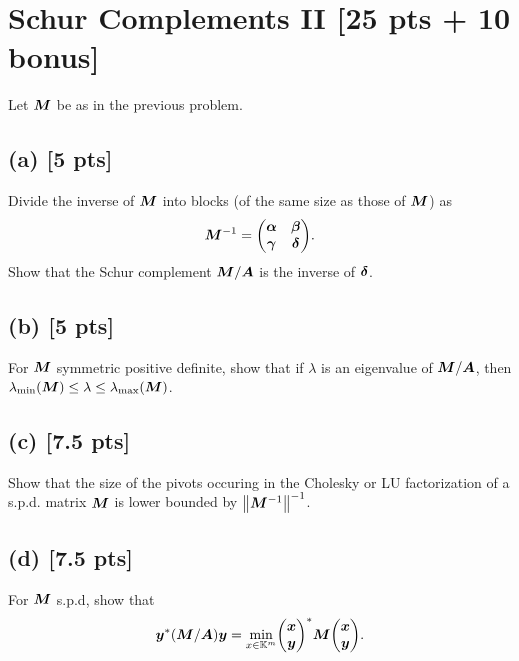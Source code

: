 \documentclass[twoside,10pt]{article}
\begin{document}
\section{Schur Complements II [25 pts + 10 bonus]}
Let $\bm{M}$ be as in the previous problem. 

\subsection*{(a) [5 pts]}
Divide the inverse of $\bm{M}$ into blocks (of the same size as those of $\bm{M}$) as
\begin{equation}
  \mtx{M}^{-1} = 
  \begin{pmatrix}
    \mtx{\alpha} & \mtx{\beta} \\
    \mtx{\gamma} & \mtx{\delta}
  \end{pmatrix}.
\end{equation}
Show that the Schur complement $\bm{M} / \bm{A}$ is the inverse of $\bm{\delta}$.

\subsection*{(b) [5 pts]} 
For $\bm{M}$ symmetric positive definite, show that if $\lambda$ is an eigenvalue of $\bm{M} / \bm{A}$, then $\lambda_{\min}\left(\mtx{M} \right) \leq \lambda \leq \lambda_{\max}\left(\mtx{M}\right)$.

\subsection*{(c) [7.5 pts]} 
Show that the size of the pivots occuring in the Cholesky or LU factorization of a s.p.d. matrix $\bm{M}$ is lower bounded by $\left\|\mtx{M}^{-1}\right\|^{-1}$.

\subsection*{(d) [7.5 pts]}
For $\bm{M}$ s.p.d, show that 
\begin{equation} 
  \vct{y}^* \left(\mtx{M} / \mtx{A}\right) \vct{y} = \min \limits_{x \in \K^{m}} 
  \begin{pmatrix}
    \vct{x}\\
    \vct{y} 
  \end{pmatrix}^* 
  \mtx{M}
  \begin{pmatrix}
    \vct{x}\\
    \vct{y} 
  \end{pmatrix}.
\end{equation}
\end{document}
